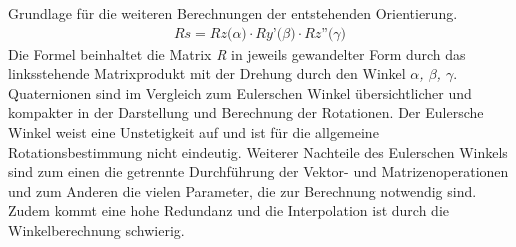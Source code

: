 Grundlage für die weiteren Berechnungen der entstehenden Orientierung. \cite{quaternionRichter.2020m}
\begin{align}
    \textit{Rs} = \textit{Rz($\alpha$)} \cdot \textit{Ry'($\beta$)} \cdot \textit{Rz''($\gamma$)}
\end{align}
Die Formel beinhaltet die Matrix \textit{R} in jeweils gewandelter Form durch das linksstehende Matrixprodukt mit der Drehung durch den Winkel \textit{$\alpha$, $\beta$, $\gamma$}.
\\ 
\linebreak
Quaternionen sind im Vergleich zum Eulerschen Winkel übersichtlicher und kompakter in der Darstellung und Berechnung der Rotationen. \cite{quaternionRichter.2020m} 
Der Eulersche Winkel weist eine Unstetigkeit auf und ist für die allgemeine Rotationsbestimmung nicht eindeutig. \cite{euler.2000} Weiterer Nachteile des 
Eulerschen Winkels sind zum einen die getrennte Durchführung der Vektor- und Matrizenoperationen und zum Anderen die vielen Parameter, die zur Berechnung notwendig sind. 
Zudem kommt eine hohe Redundanz und die Interpolation ist durch die Winkelberechnung schwierig. \cite{quaternionRichter.2020m}
